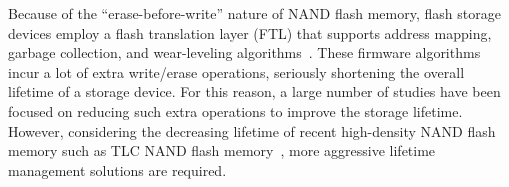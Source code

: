 
Because of the ``erase-before-write'' nature of NAND flash memory, 
flash storage devices employ a flash translation layer (FTL) 
that supports address mapping, garbage collection, and wear-leveling algorithms~\cite{FAST}. %
These firmware algorithms incur a lot of extra write/erase operations,
seriously shortening the overall lifetime of a storage device.
For this reason, a large number of studies have been focused on reducing such extra operations to improve the storage 
lifetime.
However, considering the decreasing lifetime of recent high-density NAND flash memory such as TLC NAND flash memory~\cite{tlc}, %
more aggressive lifetime management solutions are required. 

